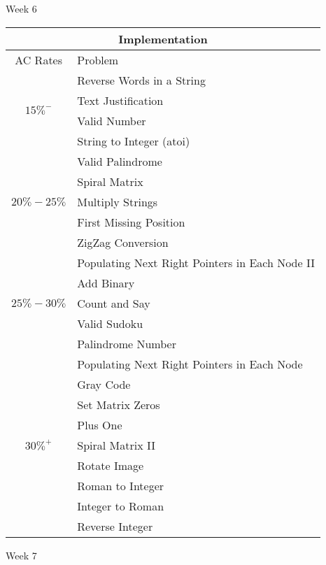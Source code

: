 \documentclass[paper=a4, fontsize=11pt]{scrartcl} %
\begin{document}
\begin{center}
  \pagebreak

  \begin{center}
    Week 6
  \end{center}

  \begin{tabular}{|c|l|}
      \hline
      \multicolumn{2}{|c|}{Implementation} \\
      \hline
      AC Rates      &   Problem     \\
      \hline
      \multirow{4}{*}{$15\%^-$}  &    Reverse Words in a String  \\
          & Text Justification  \\
          & Valid Number    \\
          & String to Integer (atoi)    \\
      \hline
      \multirow{5}{*}{$20\%-25\%$}  &    Valid Palindrome   \\
          & Spiral Matrix   \\
          & Multiply Strings    \\
          & First Missing Position  \\
          & ZigZag Conversion   \\
      \hline
      \multirow{5}{*}{$25\%-30\%$}  &    Populating Next Right Pointers in Each Node II   \\
          & Add Binary   \\
          & Count and Say   \\
          & Valid Sudoku    \\
          & Palindrome Number   \\
      \hline
      \multirow{9}{*}{$30\%^+$}  &  Populating Next Right Pointers in Each Node \\
          & Gray Code   \\
          & Set Matrix Zeros    \\
          & Plus One    \\
          & Spiral Matrix II    \\
          & Rotate Image    \\
          & Roman to Integer    \\
          & Integer to Roman    \\
          & Reverse Integer \\
      \hline
  \end{tabular}

  \pagebreak

  \begin{center}
    Week 7
  \end{center}


\end{center}
\end{document}
